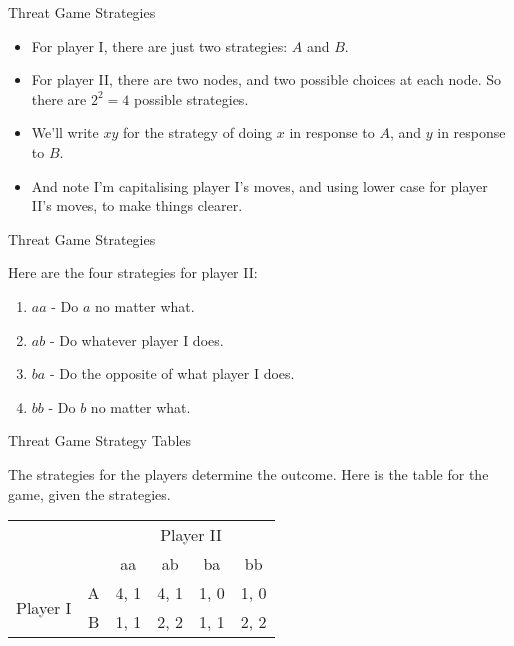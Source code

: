 \documentclass[ignorenonframetext,]{beamer}
\providecommand{\tightlist}{%
  \setlength{\itemsep}{0pt}\setlength{\parskip}{0pt}}
\renewcommand{\,}{\text{, }}
\begin{document}
\begin{frame}{Threat Game Strategies}
\protect\hypertarget{threat-game-strategies}{}

\begin{itemize}
\tightlist
\item
  For player I, there are just two strategies: \(A\) and \(B\).
\item
  For player II, there are two nodes, and two possible choices at each
  node. So there are \(2^2 = 4\) possible strategies.
\item
  We'll write \(xy\) for the strategy of doing \(x\) in response to
  \(A\), and \(y\) in response to \(B\).
\item
  And note I'm capitalising player I's moves, and using lower case for
  player II's moves, to make things clearer.
\end{itemize}

\end{frame}

\begin{frame}{Threat Game Strategies}
\protect\hypertarget{threat-game-strategies-1}{}

Here are the four strategies for player II:

\begin{enumerate}
\tightlist
\item
  \(aa\) - Do \(a\) no matter what.
\item
  \(ab\) - Do whatever player I does.
\item
  \(ba\) - Do the opposite of what player I does.
\item
  \(bb\) - Do \(b\) no matter what.
\end{enumerate}

\end{frame}

\begin{frame}{Threat Game Strategy Tables}
\protect\hypertarget{threat-game-strategy-tables}{}

The strategies for the players determine the outcome. Here is the table
for the game, given the strategies.

\begin{center}
\begin{tabular}{l r | c c c c}
& & \multicolumn{4}{c}{Player II} \\
& & aa & ab & ba & bb \\ \hline 
\multirow{2}{*}{Player I} 
& A & 4, 1 & 4, 1 & 1, 0 & 1, 0 \\
& B & 1, 1 & 2, 2 & 1, 1 & 2, 2 
\end{tabular}
\end{center}

\end{frame}
\end{document}

